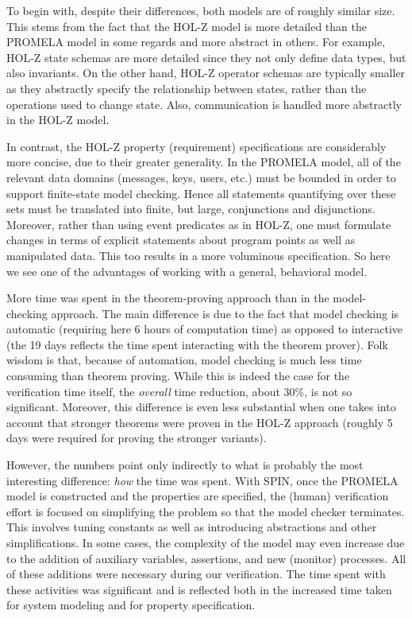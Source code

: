 \documentclass[a4paper,pdftex]{article}
\begin{document}
To begin with, despite their differences, both models are of
roughly similar size.  This stems from the fact
that the HOL-Z model is more detailed than the
PROMELA model in some regards and more abstract in others.
For example, HOL-Z state schemas are more detailed since they not
only define data types, but also invariants.  On the other hand, 
HOL-Z operator schemas are typically smaller as they abstractly
specify the relationship between states,
rather than the operations used to change state.  Also, communication
is handled more abstractly in the HOL-Z model.

In contrast, the HOL-Z property (requirement) specifications are
considerably more concise, due to their greater generality.  In the
PROMELA model, all of the relevant data domains (messages, keys, users,
etc.) must be bounded in order to support finite-state model checking.
Hence all statements quantifying over these sets must be translated
into finite, but large, conjunctions and disjunctions.  Moreover, rather
than using event predicates as in HOL-Z, one must formulate changes in
terms of explicit statements about program points as well as
manipulated data.  This too results in a more voluminous specification.
So here we see one of the advantages of working with a general,
behavioral model.

More time was spent in the theorem-proving approach than in the
model-checking approach. The main difference is due to the fact that model
checking is automatic (requiring here 6 hours of computation time) as
opposed to interactive (the 19 days reflects the time spent interacting
with the theorem prover).  Folk wisdom is that, because of automation,
model checking is much less time consuming than theorem
proving.  While this is indeed the case for the verification time
itself, the \emph{overall} time reduction, about 30\%, is not so significant.
Moreover, this difference is even less substantial when one takes into
account that stronger theorems were proven in the HOL-Z
approach (roughly 5 days were required for proving the stronger
variants).

However, the numbers point only indirectly to what is probably the most
interesting difference: \emph{how} the time was spent.  With SPIN, once
the PROMELA model is constructed and the properties are specified, the
(human) verification effort is focused on simplifying the problem so
that the model checker terminates.  This involves tuning constants as well as
introducing abstractions and other simplifications.  In some cases, the
complexity of the model may even increase due to the addition of
auxiliary variables, assertions, and new (monitor) processes.  All of
these additions were necessary during our verification.  The time spent
with these activities was significant and is reflected both in the
increased time taken for system modeling and for property specification.
\end{document}
